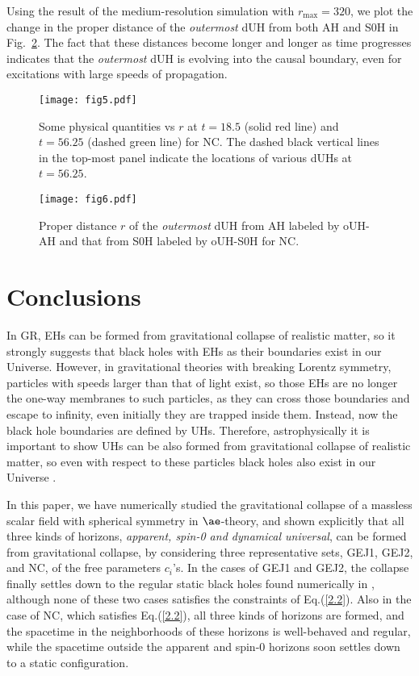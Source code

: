 \documentclass[aps,preprintnumbers,twocolumn,showpacs]{revtex4-1}
\begin{document}
Using the result of the medium-resolution simulation with $r_\text{max}=320$, we plot the change in the proper distance of the \textit{outermost} dUH from both  AH and S0H in Fig.~\ref{fig:NCcausal}. The fact that these distances become longer and longer as time progresses indicates that the \textit{outermost} dUH is evolving into the causal boundary, even for excitations with large speeds of propagation. 


\begin{figure}
\texttt{[image: fig5.pdf]} %
\caption{ Some physical quantities vs $r$ at $t=18.5$ (solid red line) and $t=56.25$ (dashed green line) for NC. The dashed black vertical lines in the top-most panel indicate the locations of various dUHs  at $t=56.25$. 
\label{fig:NCcurv}}
\end{figure}

\begin{figure}
\texttt{[image: fig6.pdf]} %
\caption{Proper distance $r$ of the \textit{outermost} dUH from  AH labeled by oUH-AH and  that from S0H labeled by oUH-S0H for NC. 
\label{fig:NCcausal}}
\end{figure}

\section{Conclusions}

 In GR, EHs can be formed from gravitational collapse of realistic matter, so it strongly suggests that black holes with EHs as their boundaries exist in our Universe. However, in gravitational theories with breaking Lorentz symmetry,   particles with speeds larger than that of light exist, so those EHs are  no longer the one-way membranes to such particles, as they can cross those boundaries and escape  to infinity, even initially they are trapped inside them.  Instead, now the black hole boundaries are defined by UHs. Therefore, astrophysically it is important to show UHs can be also formed from gravitational collapse of realistic matter, so even with respect to these particles black holes  also exist in our Universe    \cite{SAM14,TWSW15,BCCS16}. 

In this paper, we have numerically studied the gravitational collapse of a massless scalar field with spherical symmetry in $\ae$-theory, and shown explicitly that all three kinds of horizons, {\em apparent, spin-0 and dynamical universal},  can be formed from gravitational collapse, by considering three representative sets, GEJ1, GEJ2, and NC, of the free parameters $c_i$'s. In the cases of GEJ1 and GEJ2,  the collapse finally settles down to the regular static black holes found numerically in  \cite{EJ06}, although none of these two cases satisfies the constraints of Eq.(\ref{2.2}). Also in the  case of NC, which satisfies Eq.(\ref{2.2}), all three kinds of horizons are formed, and the spacetime in the neighborhoods of  these horizons is well-behaved and  regular, while the spacetime outside the apparent and spin-0 horizons soon settles down to a static configuration. 
\end{document}

